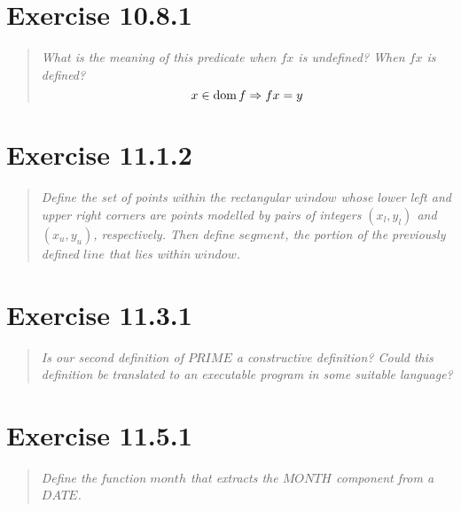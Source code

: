 \documentclass[10pt]{article}
\begin{document}


\section{Exercise 10.8.1}
\begin{quote}
  {\it What is the meaning of this predicate when $f x$ is undefined?  When $f x$ is defined?
  \[ x \in \mathop{\mathrm{dom}} f \Rightarrow f  x = y \] }
\end{quote}



\section{Exercise 11.1.2}
\begin{quote}
  {\it Define the set of points within the rectangular $window$ whose lower left and upper right
    corners are points modelled by pairs of integers $(x_l, y_l)$ and $(x_u, y_u)$, respectively.
    Then define $segment$, the portion of the previously defined $line$ that lies within $window$.  }
\end{quote}



\section{Exercise 11.3.1}
\begin{quote}
  {\it Is our second definition of $PRIME$ a constructive definition?  Could this definition be
    translated to an executable program in some suitable language?  }
\end{quote}



\section{Exercise 11.5.1}
\begin{quote}
  {\it Define the function $month$ that extracts the $MONTH$ component from a $DATE$.  }
\end{quote}

\end{document}

